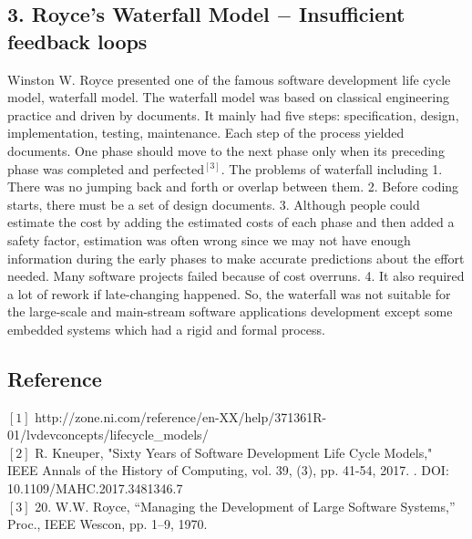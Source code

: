 \documentclass[11pt]{report}
\begin{document}
\subsection*{3. Royce’s Waterfall Model $-$ Insufficient feedback loops}
Winston W. Royce presented one of the famous software development life cycle model, waterfall model. The waterfall model was based on classical engineering practice and driven by documents. It mainly had five steps: specification, design, implementation, testing, maintenance. Each step of the process yielded documents. One phase should move to the next phase only when its preceding phase was completed and perfected$^{[3]}$.
The problems of waterfall including 1. There was no jumping back and forth or overlap between them. 2. Before coding starts, there must be a set of design documents. 3. Although people could estimate the cost by adding the estimated costs of each phase and then added a safety factor, estimation was often wrong since we may not have enough information during the early phases to make accurate predictions about the effort needed. Many software projects failed because of cost overruns. 4. It also required a lot of rework if late-changing happened. So, the waterfall was not suitable for the large-scale and main-stream software applications development except some embedded systems which had a rigid and formal process.\\
\subsection*{Reference}
$\left[1\right]$ http://zone.ni.com/reference/en-XX/help/371361R-01/lvdevconcepts/lifecycle\_models/\\
$\left[2\right]$ R. Kneuper, "Sixty Years of Software Development Life Cycle Models," IEEE Annals of the History of Computing, vol. 39, (3), pp. 41-54, 2017. . DOI: 10.1109/MAHC.2017.3481346.7\\
$\left[3\right]$ 20. W.W. Royce, “Managing the Development of Large Software Systems,” Proc., IEEE Wescon, pp. 1–9, 1970.
\end{document}
